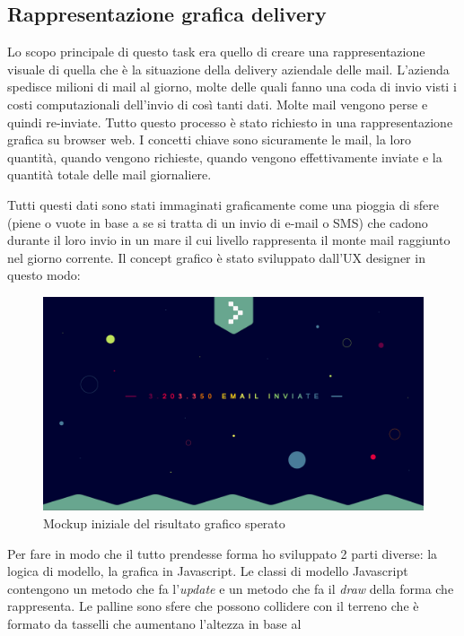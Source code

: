 \documentclass[a4paper]{article}
\begin{document}
\subsection{Rappresentazione grafica delivery}
\par Lo scopo principale di questo task era quello di creare una rappresentazione visuale
di quella che è la situazione della delivery aziendale delle mail. L'azienda spedisce
milioni di mail al giorno, molte delle quali fanno una coda di invio visti i costi 
computazionali dell'invio di così tanti dati. Molte mail vengono perse e quindi re-inviate.
Tutto questo processo è stato richiesto in una rappresentazione grafica su browser web.
I concetti chiave sono sicuramente le mail, la loro quantità, quando vengono richieste, quando
vengono effettivamente inviate e la quantità totale delle mail giornaliere.
\par Tutti questi dati sono stati immaginati graficamente come una pioggia di sfere (piene o vuote
in base a se si tratta di un invio di e-mail o SMS) che cadono durante il loro invio in un mare il cui
livello rappresenta il monte mail raggiunto nel giorno corrente. Il concept grafico è stato sviluppato
dall'UX designer in questo modo:
\begin{figure}[H]
	\includegraphics[width=\textwidth]{Monitor.jpg}
	\centering
	\caption{Mockup iniziale del risultato grafico sperato}
\end{figure}
\par Per fare in modo che il tutto prendesse forma ho sviluppato 2 parti diverse: la logica di modello,
la grafica in Javascript. Le classi di modello Javascript contengono un metodo che fa l'\emph{update}
e un metodo che fa il \emph{draw} della forma che rappresenta. Le palline sono sfere che possono 
collidere con il terreno che è formato da tasselli che aumentano l'altezza in base al 
\end{document}
